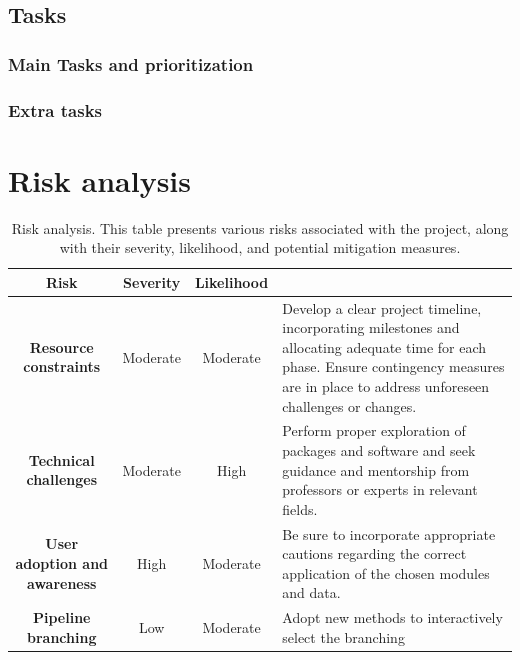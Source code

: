 \documentclass[ENG, BIB]{TFUOC}%
\begin{document}
\subsection{Tasks}
\subsubsection{Main Tasks and prioritization}


\subsubsection{Extra tasks}


\section{Risk analysis}

\begin{table}[!h]
    \centering
    \begin{tabular}{|c|c|c|p{6cm}|}
    \hline
    \rowcolor[HTML]{999999} 
    {\color[HTML]{FFFFFF} \textbf{Risk}} &
      {\color[HTML]{FFFFFF} \textbf{Severity}} &
      {\color[HTML]{FFFFFF} \textbf{Likelihood}} &
      \multicolumn{1}{c|}{\cellcolor[HTML]{999999}{\color[HTML]{FFFFFF} \textbf{Mitigation}}} \\ \hline
    \textbf{Resource constraints} &
      \cellcolor[HTML]{FFE599}Moderate &
      \cellcolor[HTML]{FFE599}Moderate &
      Develop a clear project timeline, incorporating milestones and allocating adequate time for each phase. Ensure contingency measures are in place to address unforeseen challenges or changes. \\ \hline
    \textbf{Technical challenges} &
      \cellcolor[HTML]{FFE599}Moderate &
      \cellcolor[HTML]{EA9999}High &
      Perform proper exploration of packages and software and seek guidance and mentorship from professors or experts in relevant fields. \\ \hline
    \textbf{User adoption and awareness} &
      \cellcolor[HTML]{EA9999}High &
      \cellcolor[HTML]{FFE599}Moderate &
      Be sure to incorporate appropriate cautions regarding the correct application of the chosen modules and data. \\ \hline
    \textbf{Pipeline branching} &
      \cellcolor[HTML]{B6D7A8}Low &
      \cellcolor[HTML]{FFE599}Moderate &
      Adopt new methods to interactively select the branching \\ \hline
    \end{tabular}
    \caption{Risk analysis. This table presents various risks associated with the project, along with
    their severity, likelihood, and potential mitigation measures.}
    \label{tab:risk-analysis}
\end{table}
\end{document}
